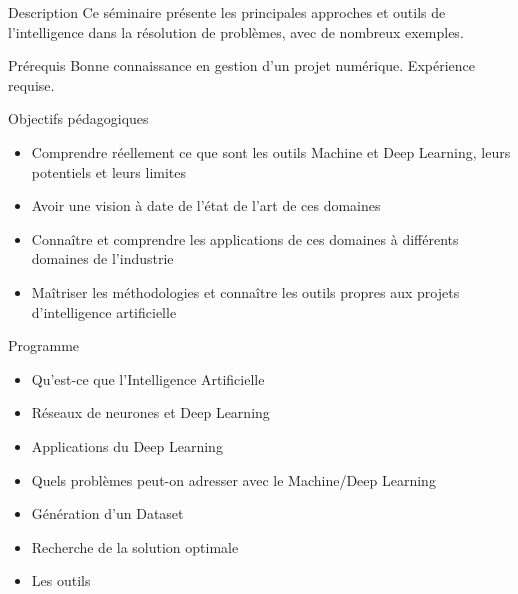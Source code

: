 
\begin{frame}{Description}
  Ce séminaire présente les principales approches et outils de l'intelligence dans la résolution de problèmes, avec de nombreux exemples.
\end{frame}

\begin{frame}{Prérequis}
  Bonne connaissance en gestion d'un projet numérique.
  Expérience requise.
\end{frame}

\begin{frame}{Objectifs pédagogiques}
  \begin{itemize}
  \item Comprendre réellement ce que sont les outils Machine et Deep Learning, leurs potentiels et leurs limites
  \item Avoir une vision à date de l'état de l'art de ces domaines
  \item Connaître et comprendre les applications de ces domaines à différents domaines de l'industrie
  \item Maîtriser les méthodologies et connaître les outils propres aux projets d'intelligence artificielle
  \end{itemize}
\end{frame}

\begin{frame}{Programme}
  \begin{itemize}
  \item Qu'est-ce que l'Intelligence Artificielle
  \item Réseaux de neurones et Deep Learning
  \item Applications du Deep Learning
  \item Quels problèmes peut-on adresser avec le Machine/Deep Learning
  \item Génération d'un Dataset
  \item Recherche de la solution optimale
  \item Les outils
  \end{itemize}
\end{frame}
